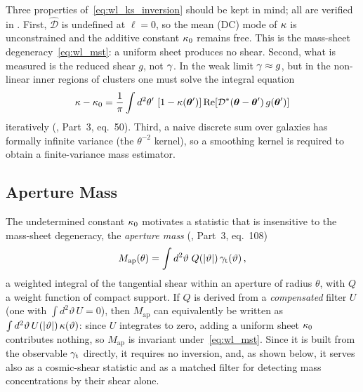 \begin{remark}
Three properties of~\eqref{eq:wl_ks_inversion} should be kept in mind;
all are verified in
.
First, $\hat{\mathcal D}$ is undefined at $\boldsymbol\ell = 0$, so the
mean (DC) mode of $\kappa$ is unconstrained and the additive constant
$\kappa_0$ remains free.  This is the mass-sheet
degeneracy~\eqref{eq:wl_mst}: a uniform sheet produces no shear.
Second, what is measured is the reduced shear $g$, not $\gamma$.  In
the weak limit $\gamma \approx g$, but in the non-linear inner regions
of clusters one must solve the integral equation
\begin{equation*}
    \kappa - \kappa_0 = \frac{1}{\pi}\int d^2\theta'\,
    \left[1 - \kappa(\boldsymbol{\theta}')\right]
    \mathrm{Re}\!\left[\mathcal{D}^*(\boldsymbol{\theta} - \boldsymbol{\theta}')\,
    g(\boldsymbol{\theta}')\right]
\end{equation*}
iteratively
(\citealp{schneider_kochanek_wambsganss_2006}, Part~3, eq.~50).
Third, a naive discrete sum over galaxies has formally infinite
variance (the $\theta^{-2}$ kernel), so a smoothing kernel is
required to obtain a finite-variance mass estimator.
\end{remark}

\subsection{Aperture Mass}
\label{sec:wl_apmass}

The undetermined constant $\kappa_0$ motivates a statistic that is
insensitive to the mass-sheet degeneracy, the \emph{aperture mass}
(\citealp{schneider_kochanek_wambsganss_2006}, Part~3, eq.~108)
\begin{equation}
    M_{\mathrm{ap}}(\theta) = \int d^2\vartheta\;
    Q(|\vartheta|)\,\gamma_{\mathrm t}(\vartheta)\,,
    \label{eq:wl_Map}
\end{equation}
a weighted integral of the tangential shear within an aperture of radius
$\theta$, with $Q$ a weight function of compact support.  If $Q$ is
derived from a \emph{compensated} filter $U$ (one with
$\int d^2\vartheta\, U = 0$), then $M_{\mathrm{ap}}$ can equivalently be
written as $\int d^2\vartheta\, U(|\vartheta|)\,\kappa(\vartheta)$: since
$U$ integrates to zero, adding a uniform sheet $\kappa_0$ contributes
nothing, so $M_{\mathrm{ap}}$ is invariant under~\eqref{eq:wl_mst}.
Since it is built from the observable $\gamma_{\mathrm t}$ directly, it
requires no inversion, and, as shown below, it serves also as a
cosmic-shear statistic and as a matched filter for detecting mass
concentrations by their shear alone.

